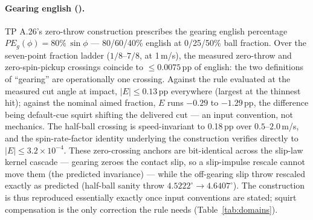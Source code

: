 \paragraph{Gearing english ().}
TP A.26's zero-throw construction \citep{alciatore_tp_a26} prescribes the
gearing english percentage $PE_g(\phi) = 80\%\,\sin\phi$ --- 80/60/40\%
english at 0/25/50\% ball fraction. Over the seven-point fraction ladder
($1/8$--$7/8$, at 1\,m/s), the measured zero-throw and
zero-spin-pickup crossings coincide to $\le 0.0075$\,pp of english: the
two definitions of ``gearing'' are operationally one crossing. Against
the rule evaluated at the measured cut angle at impact, $|E| \le
0.13$\,pp everywhere (largest at the thinnest hit); against the nominal
aimed fraction, $E$ runs $-0.29$ to $-1.29$\,pp, the difference being
default-cue squirt shifting the delivered cut --- an input convention, not
mechanics. The half-ball crossing is speed-invariant to 0.18\,pp over
$0.5$--$2.0$\,m/s, and the spin-rate-factor identity underlying the
construction verifies directly to $|E| \le 3.2 \times 10^{-4}$. These
zero-crossing anchors are bit-identical across the slip-law kernel cascade
--- gearing zeroes the contact slip, so a slip-impulse rescale cannot
move them (the predicted invariance) --- while the off-gearing slip throw
rescaled exactly as predicted (half-ball sanity throw
$4.5222^\circ \to 4.6407^\circ$). The construction is thus reproduced
essentially exactly once input conventions are stated; squirt
compensation is the only correction the rule needs
(Table~\ref{tab:domains}).

